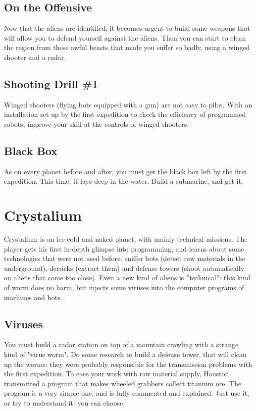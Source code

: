 \subsection{On the Offensive}

Now that the aliens are identified, it becomes urgent to build some weapons that will allow you to defend yourself against the aliens. Then you can start to clean the region from these awful beasts that made you suffer so badly, using a winged shooter and a radar.


\subsection{Shooting Drill \#1}

Winged shooters (flying bots equipped with a gun) are not easy to pilot. With an installation set up by the first expedition to check the efficiency of programmed robots, improve your skill at the controls of winged shooters.


\subsection{Black Box}

As on every planet before and after, you must get the black box left by the first expedition. This time, it lays deep in the water. Build a submarine, and get it.


\section{Crystalium}

Crystalium is an ice-cold and naked planet, with mainly technical missions. The player gets his first in-depth glimpse into programming, and learns about some technologies that were not used before: sniffer bots (detect raw materials in the underground), derricks (extract them) and defense towers (shoot automatically on aliens that come too close). Even a new kind of aliens is ''technical'': this kind of worm does no harm, but injects some viruses into the computer programs of machines and bots...


\subsection{Viruses}

You must build a radar station on top of a mountain crawling with a strange kind of "virus worm". Do some research to build a defense tower, that will clean up the worms: they were probably responsible for the transmission problems with the first expedition. To ease your work with raw material supply, Houston transmitted a program that makes wheeled grabbers collect titanium ore. The program is a very simple one, and is fully commented and explained. Just use it, or try to understand it: you can choose.


